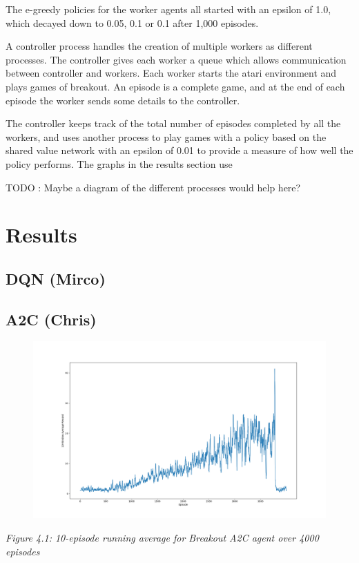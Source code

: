 \documentclass{article}
\begin{document}
The e-greedy policies for the worker agents all started with an epsilon of 1.0, which decayed down to 0.05, 0.1 or 0.1 after 1,000 episodes.

A controller process handles the creation of multiple workers as different processes.
The controller gives each worker a queue which allows communication between controller and workers.
Each worker starts the atari environment and plays games of breakout.
An episode is a complete game, and at the end of each episode the worker sends some details to the controller.

The controller keeps track of the total number of episodes completed by all the workers, and uses another process to play games with a policy based on the shared value network with an epsilon of 0.01 to provide a measure of how well the policy performs.
The graphs in the results section use

TODO : Maybe a diagram of the different processes would help here?


\section{Results}


\subsection{DQN (Mirco)}
\subsection{A2C (Chris)}

\begin{figure}[h]
\includegraphics[scale=0.2]{A2C4000.png}
\end{figure}
\emph{Figure 4.1: 10-episode running average for Breakout A2C agent over 4000 episodes}
\end{document}

